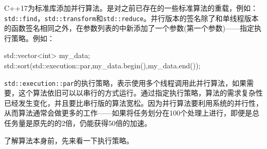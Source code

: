 
C++17为标准库添加并行算法。是对之前已存在的一些标准算法的重载，例如：\texttt{std::find}，\texttt{std::transform}和\texttt{std::reduce}。并行版本的签名除了和单线程版本的函数签名相同之外，在参数列表的中新添加了一个参数(第一个参数)——指定执行策略。例如：

\begin{cpp}
std::vector<int> my_data;
std::sort(std::execution::par,my_data.begin(),my_data.end());
\end{cpp}

\texttt{std::execution::par}的执行策略，表示使用多个线程调用此并行算法，如果需要，这个算法依旧可以以串行的方式运行。通过指定执行策略，算法的需求复杂性已经发生变化，并且要比串行版的算法宽松。因为并行算法要利用系统的并行性，从而算法通常会做更多的工作——如果将任务划分在100个处理上进行，即便是总任务量是原先的的2倍，仍能获得50倍的加速。

了解算法本身前，先来看一下执行策略。